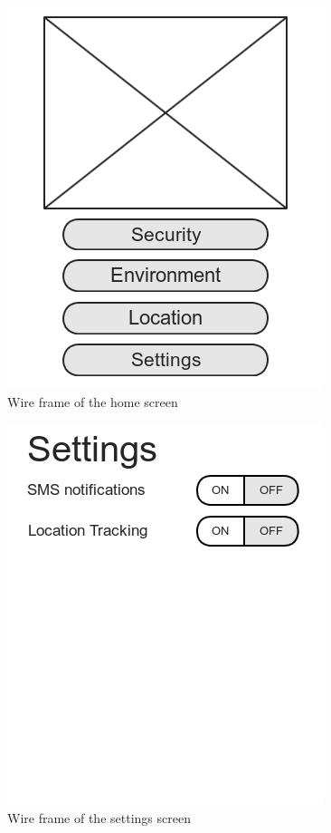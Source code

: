 \documentclass{report}
\begin{document}
\begin{figure}[H]
    \centering
    \includegraphics[scale=0.5]{mock_home}
    \caption[Wire frame of the home screen]
            {Wire frame of the home screen}
    \label{fig:wireframe-home}
\end{figure}

\begin{figure}[H]
    \centering
    \includegraphics[scale=0.5]{mock_settings}
    \caption[Wire frame of the settings screen]
            {Wire frame of the settings screen}
    \label{fig:wireframe-settings}
\end{figure}
\end{document}

